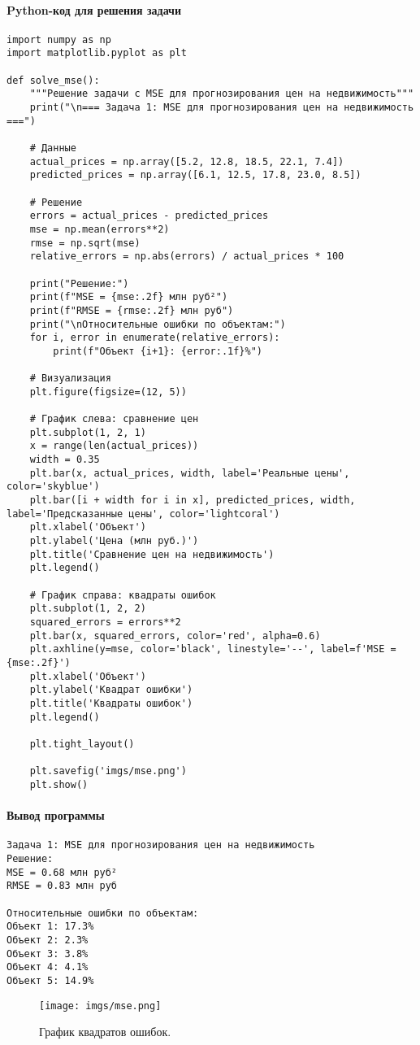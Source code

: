 \paragraph*{Python-код для решения задачи}

\begin{verbatim}
import numpy as np
import matplotlib.pyplot as plt

def solve_mse():
    """Решение задачи с MSE для прогнозирования цен на недвижимость"""
    print("\n=== Задача 1: MSE для прогнозирования цен на недвижимость ===")
    
    # Данные
    actual_prices = np.array([5.2, 12.8, 18.5, 22.1, 7.4])
    predicted_prices = np.array([6.1, 12.5, 17.8, 23.0, 8.5])
    
    # Решение
    errors = actual_prices - predicted_prices
    mse = np.mean(errors**2)
    rmse = np.sqrt(mse)
    relative_errors = np.abs(errors) / actual_prices * 100
    
    print("Решение:")
    print(f"MSE = {mse:.2f} млн руб²")
    print(f"RMSE = {rmse:.2f} млн руб")
    print("\nОтносительные ошибки по объектам:")
    for i, error in enumerate(relative_errors):
        print(f"Объект {i+1}: {error:.1f}%")
    
    # Визуализация
    plt.figure(figsize=(12, 5))
    
    # График слева: сравнение цен
    plt.subplot(1, 2, 1)
    x = range(len(actual_prices))
    width = 0.35
    plt.bar(x, actual_prices, width, label='Реальные цены', color='skyblue')
    plt.bar([i + width for i in x], predicted_prices, width, label='Предсказанные цены', color='lightcoral')
    plt.xlabel('Объект')
    plt.ylabel('Цена (млн руб.)')
    plt.title('Сравнение цен на недвижимость')
    plt.legend()
    
    # График справа: квадраты ошибок
    plt.subplot(1, 2, 2)
    squared_errors = errors**2
    plt.bar(x, squared_errors, color='red', alpha=0.6)
    plt.axhline(y=mse, color='black', linestyle='--', label=f'MSE = {mse:.2f}')
    plt.xlabel('Объект')
    plt.ylabel('Квадрат ошибки')
    plt.title('Квадраты ошибок')
    plt.legend()
    
    plt.tight_layout()
    
    plt.savefig('imgs/mse.png')
    plt.show()
\end{verbatim}

\paragraph{Вывод программы}
\begin{verbatim}
Задача 1: MSE для прогнозирования цен на недвижимость
Решение:
MSE = 0.68 млн руб²
RMSE = 0.83 млн руб

Относительные ошибки по объектам:
Объект 1: 17.3%
Объект 2: 2.3%
Объект 3: 3.8%
Объект 4: 4.1%
Объект 5: 14.9%
\end{verbatim}
\begin{figure}[h!]
    \centering
    \texttt{[image: imgs/mse.png]}
    \caption{График квадратов ошибок.}
    \label{fig:mse_graph}
\end{figure}

